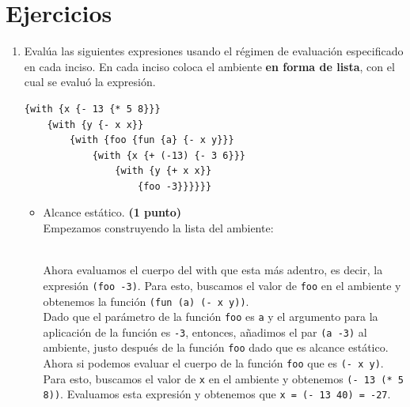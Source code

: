 \documentclass[11pt]{article}
\begin{document}
\section*{Ejercicios}

\begin{enumerate}[leftmargin=0.8cm]

    \item Evalúa las siguientes expresiones usando el régimen de evaluación especificado en cada inciso. En cada inciso coloca el ambiente \textbf{en forma de lista}, con el cual se evaluó la expresión.
    \begin{lstlisting}
{with {x {- 13 {* 5 8}}}
    {with {y {- x x}}
        {with {foo {fun {a} {- x y}}}
            {with {x {+ (-13) {- 3 6}}}
                {with {y {+ x x}}
                    {foo -3}}}}}}
    \end{lstlisting}
    \begin{itemize}
        \item Alcance estático. \textbf{(1 punto)}\\
            Empezamos construyendo la lista del ambiente:\\
            \hspace*{-0.5cm}
            \\
            Ahora evaluamos el cuerpo del with que esta más adentro, es decir, la expresión \texttt{(foo -3)}. Para esto, buscamos el valor de \texttt{foo} en el ambiente y obtenemos la función \texttt{(fun (a) (- x y))}.\\
            Dado que el parámetro de la función \texttt{foo} es \texttt{a} y el argumento para la aplicación de la función es \texttt{-3}, entonces, añadimos el par \texttt{(a -3)} al ambiente, justo después de la función \texttt{foo} dado que es alcance estático.\\
            Ahora si podemos evaluar el cuerpo de la función \texttt{foo} que es \texttt{(- x y)}. Para esto, buscamos el valor de \texttt{x} en el ambiente y obtenemos \texttt{(- 13 (* 5 8))}. Evaluamos esta expresión y obtenemos que \texttt{x = (- 13 40) = -27}.\\

\end{itemize}
\end{enumerate}
\end{document}
